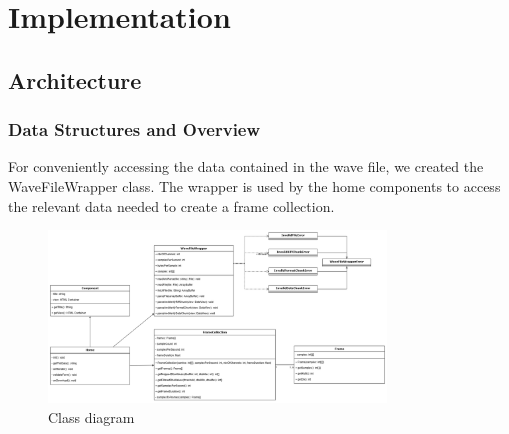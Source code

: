 \section{Implementation}

\subsection{Architecture}

\subsubsection{Data Structures and Overview}
For conveniently accessing the data contained in the wave file, we created the WaveFileWrapper class. The wrapper is used by the home components to access the relevant data needed to create a frame collection. 

\begin{figure}[H]
    \centering
    \includegraphics[width=0.8\textwidth]{../assets/class_diagram.png}
    \caption{Class diagram}
\end{figure}

